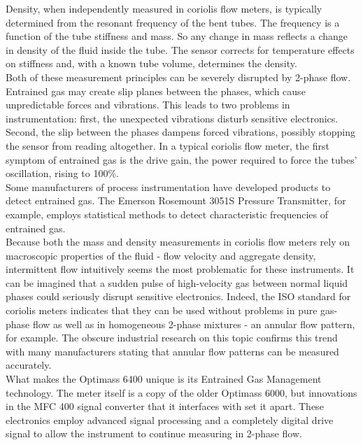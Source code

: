 \documentclass{report}
\begin{document}
Density, when independently measured in coriolis flow meters, is typically determined from the resonant frequency of the bent tubes. \cite{ISO}\cite{O'Banion 2013} The frequency is a function of the tube stiffness and mass. So any change in mass reflects a change in density of the fluid inside the tube. The sensor corrects for temperature effects on stiffness and, with a known tube volume, determines the density. \cite{ISO}\\
Both of these measurement principles can be severely disrupted by 2-phase flow. Entrained gas may create slip planes between the phases, which cause unpredictable forces and vibrations.\cite{ISO}\cite{processArticle}\cite{emerson2Phase} This leads to two problems in instrumentation: first, the unexpected vibrations disturb sensitive electronics. Second, the slip between the phases dampens forced vibrations, possibly stopping the sensor from reading altogether. In a typical coriolis flow meter, the first symptom of entrained gas is the drive gain, the power required to force the tubes' oscillation, rising to 100\%. \cite{ISO}\cite{emerson youtube}\\
Some manufacturers of process instrumentation have developed products to detect entrained gas. The Emerson Rosemount 3051S Pressure Transmitter, for example, employs statistical methods to detect characteristic frequencies of entrained gas. \cite{emerson EGM}\\
Because both the mass and density measurements in coriolis flow meters rely on macroscopic properties of the fluid - flow velocity and aggregate density, intermittent flow intuitively seems the most problematic for these instruments. It can be imagined that a sudden pulse of high-velocity gas between normal liquid phases could seriously disrupt sensitive electronics. Indeed, the ISO standard for coriolis meters indicates that they can be used without problems in pure gas-phase flow as well as in homogeneous 2-phase mixtures - an annular flow pattern, for example. \cite{ISO} The obscure industrial research on this topic confirms this trend with many manufacturers stating that annular flow patterns can be measured accurately. \cite{emerson2Phase}\\
What makes the Optimass 6400 unique is its Entrained Gas Management technology. The meter itself is a copy of the older Optimass 6000, but innovations in the MFC 400 signal converter that it interfaces with set it apart. These electronics employ advanced signal processing and a completely digital drive signal to allow the instrument to continue measuring in 2-phase flow. \cite{krohne brochure}\cite{processArticle}\\
\end{document}
